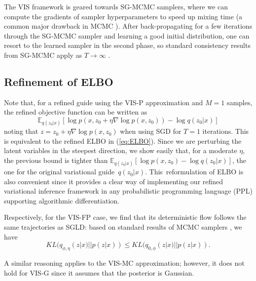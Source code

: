 The VIS framework is geared towards SG-MCMC samplers, where we can compute the gradients of sampler hyperparameters to speed up mixing time (a common major drawback in MCMC \cite{graves2011automatic}).
After back-propagating for a few iterations through the SG-MCMC sampler and learning a good initial distribution, one can resort to the learned sampler in the second phase, so standard consistency results from SG-MCMC apply as $T \rightarrow \infty$ \cite{brooks2011handbook}.

\subsection{Refinement of ELBO}\label{sec:rewriting}

 Note that, for a refined guide using the VIS-P approximation and $M=1$ samples, the refined objective function can be written as 
$$
 \mathbb{E}_{q(z_0|x)} \left[ \log p(x, z_0 + \eta \nabla \log p(x,z_0) ) - \log q(z_0 | x)\right]
$$
noting that $z = z_0 + \eta \nabla \log p(x,z_0)$ when using SGD for $T=1$ iterations.
This is equivalent to the refined ELBO in (\ref{eq:ELBO}). Since we are perturbing the latent variables in the steepest direction, we show easily that, for a moderate $\eta$, the previous bound is tighter than
$\mathbb{E}_{q(z_0|x)} \left[ \log p(x, z_0  ) - \log q(z_0 | x)\right]$, the one for the original variational guide~$q(z_0 | x)$. This~reformulation of ELBO is also convenient since it provides a clear way of implementing our refined variational inference framework in any probabilistic 
programming language (PPL) supporting algorithmic differentiation.

Respectively, for the VIS-FP case, we find that its 
deterministic flow follows the same trajectories as SGLD: 
based on standard results of MCMC samplers \cite{murray2008notes}, we have 
$$
KL(q_{\phi,\eta}(z|x) ||  p(z|x)) \leq KL(q_{0, \phi}(z|x) ||  p(z|x)).
$$

A similar reasoning applies to the VIS-MC approximation; however, it does not hold for VIS-G since it assumes that the posterior is Gaussian.

